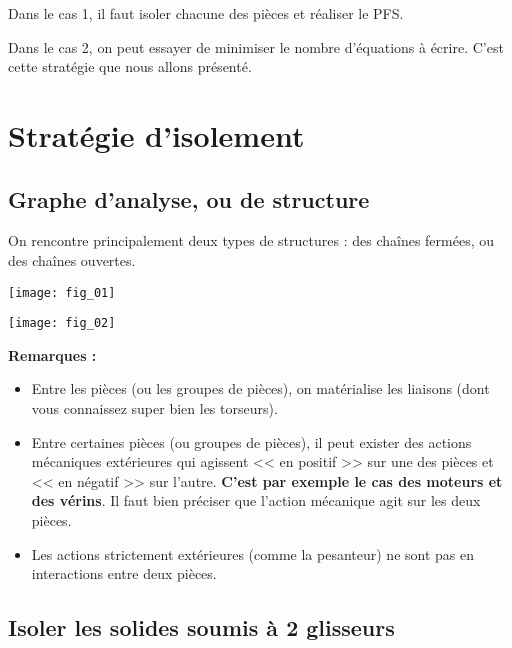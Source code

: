 Dans le cas 1, il faut isoler chacune des pièces et réaliser le PFS. 

Dans le cas 2, on peut essayer de minimiser le nombre d'équations à écrire. C'est cette stratégie que nous allons présenté.


\section{Stratégie d'isolement}

\subsection{Graphe d'analyse, ou de structure}
On rencontre principalement deux types de structures : des chaînes fermées, ou des chaînes ouvertes.

\begin{figure*}[!ht]
\begin{minipage}[c]{.4\linewidth}
\begin{center}
\texttt{[image: fig\_01]}
\end{center}
\end{minipage}
\hfill
\begin{minipage}[c]{.55\linewidth}
\begin{center}
\texttt{[image: fig\_02]}
\end{center}
\end{minipage}
\end{figure*}

\textbf{Remarques :}
\begin{itemize}
\item Entre les pièces (ou les groupes de pièces), on matérialise les liaisons (dont vous connaissez super bien les torseurs).
\item Entre certaines pièces (ou groupes de pièces), il peut exister des actions mécaniques extérieures qui agissent << en positif >> sur une des pièces et << en négatif >> sur l'autre. \textbf{C'est par exemple le cas des moteurs et des vérins}. Il faut bien préciser que l'action mécanique agit sur les deux pièces.
\item Les actions strictement extérieures (comme la pesanteur) ne sont pas en interactions entre deux pièces.
\end{itemize}


\subsection{Isoler les solides soumis à 2 glisseurs}

